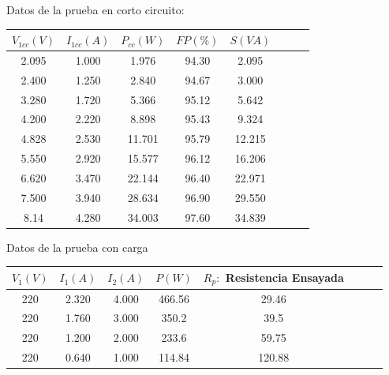 \begin{enumerate}
    Datos de la prueba en corto circuito:
    \begin{center}
        \begin{tabular}{ |c|c|c|c|c|c|c|c| } 
            \hline
            $V_{1cc}(V)$ & $I_{1cc}(A)$ & $P_{cc}(W)$ & $FP(\%)$ & $S(VA)$ \\
            \hline
            2.095 & 1.000 & 1.976 & 94.30 & 2.095 \\ 
            2.400 & 1.250 & 2.840 & 94.67 & 3.000 \\ 
            3.280 & 1.720 & 5.366 & 95.12 & 5.642 \\ 
            4.200 & 2.220 & 8.898 & 95.43 & 9.324 \\ 
            4.828 & 2.530 & 11.701 & 95.79 & 12.215 \\ 
            5.550 & 2.920 & 15.577 & 96.12 & 16.206 \\ 
            6.620 & 3.470 & 22.144 & 96.40 & 22.971 \\ 
            7.500 & 3.940 & 28.634 & 96.90 & 29.550 \\ 
            8.14 & 4.280 & 34.003 & 97.60 & 34.839 \\ 
            \hline
        \end{tabular}
    \end{center}
    
    Datos de la prueba con carga
    \begin{center}
        \begin{tabular}{ |c|c|c|c|c|c|c|c| } 
            \hline
            $V_{1}(V)$ & $I_{1}(A)$ & $I_{2}(A)$ & $P(W)$ & $R_{p}:$ Resistencia Ensayada \\
            \hline
            220 & 2.320 & 4.000 & 466.56 & 29.46 \\ 
            220 & 1.760 & 3.000 & 350.2 & 39.5 \\ 
            220 & 1.200 & 2.000 & 233.6 & 59.75 \\ 
            220 & 0.640 & 1.000 & 114.84 & 120.88 \\ 
            \hline
        \end{tabular}
    \end{center}
    

\end{enumerate}
